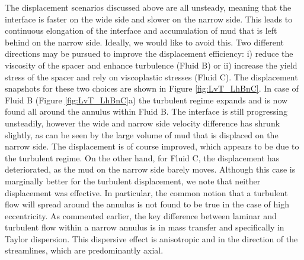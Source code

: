 \documentclass[review]{elsarticle}
\begin{document}
The displacement scenarios discussed above are all unsteady, meaning that the interface is faster on the wide side and slower on the narrow side. This leads to continuous elongation of the interface and accumulation of mud that is left behind on the narrow side. Ideally, we would like to avoid this. Two different directions may be pursued to improve the displacement efficiency: i) reduce the viscosity of the spacer and enhance turbulence (Fluid B) or ii) increase the yield stress of the spacer and rely on viscoplastic stresses (Fluid C). The displacement snapshots for these two choices are shown in Figure \ref{fig:LvT_LhBnC}. In case of Fluid B (Figure \ref{fig:LvT_LhBnC}a) the turbulent regime expands and is now found all around the annulus within Fluid B. The interface is still progressing unsteadily, however the wide and narrow side velocity difference has shrunk slightly, as can be seen by the large volume of mud that is displaced on the narrow side. The displacement is of course improved, which appears to be due to the turbulent regime. On the other hand, for Fluid C, the displacement has deteriorated, as the mud on the narrow side barely moves. Although this case is marginally better for the turbulent displacement, we note that neither displacement was effective. In particular, the common notion that a turbulent flow will spread around the annulus is not found to be true in the case of high eccentricity. As commented earlier, the key difference between laminar and turbulent flow within a narrow annulus is in mass transfer and specifically in Taylor dispersion. This dispersive effect is anisotropic and in the direction of the streamlines, which are predominantly axial.
\end{document}
